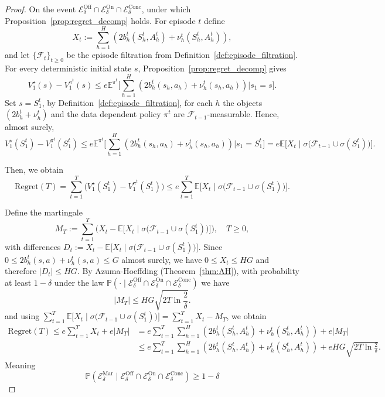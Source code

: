 \documentclass[twoside]{article}
\begin{document}
\begin{proof}
On the event \(\mathcal{E}^{\mathrm{Off}}_\delta\cap \mathcal{E}^{\mathrm{On}}_\delta \cap \mathcal{E}^{\mathrm{Conc}}_\delta \), under which Proposition~\ref{prop:regret_decomp} holds. For episode \(t\) define
\[
X_t:=\sum_{h=1}^H \left(2b_h^{t}(S_h^t,A_h^t)+ \nu_h^{t}(S_h^t,A_h^t)\right),
\]
and let \(\{\mathcal{F}_t\}_{t\ge 0}\) be the episode filtration from Definition~\ref{def:episode_filtration}. For every deterministic initial state \(s\), Proposition~\ref{prop:regret_decomp} gives
\[
V_1^\star(s)-V_1^{\pi^t}(s)\le e\mathbb{E}^{\pi^t}\Big[\sum_{h=1}^H \left(2b_h^{t}(s_h,a_h)+ \nu_h^{t}(s_h,a_h)\right)\Big|s_1=s\Big].
\]
Set \(s=S_1^t\), by Definition~\ref{def:episode_filtration}, for each \(h\) the objects \((2b_h^{t}+ \nu_h^{t})\) and the data dependent policy \(\pi^t\) are \(\mathcal{F}_{t-1}\)-measurable. Hence, almost surely,
\begin{equation}
\label{eq:step-given-G-formal}
V_1^\star(S_1^t)-V_1^{\pi^t}(S_1^t)
\le
e\mathbb{E}^{\pi^t}\Big[\sum_{h=1}^{H} \left(2b_h^{t}(s_h,a_h)+ \nu_h^{t}(s_h,a_h)\right)\Big|s_1=S_1^t\Big]
=
e\mathbb{E}\big[X_t\mid\sigma\big(\mathcal{F}_{t-1}\cup\sigma(S_1^t)\big)\big].
\end{equation}

Then, we obtain
\begin{equation}
\mathrm{Regret}(T)=\sum_{t=1}^T\big(V_1^\star(S_1^t)-V_1^{\pi^t}(S_1^t)\big)\le e\sum_{t=1}^T \mathbb{E}\big[X_t\mid \sigma\big(\mathcal{F}_{t-1}\cup\sigma(S_1^t)\big)\big].
\end{equation}

Define the martingale
\[
M_T:=\sum_{t=1}^T\Big(X_t-\mathbb{E}\big[X_t\mid \sigma\big(\mathcal{F}_{t-1}\cup\sigma(S_1^t)\big)\big]\Big),\quad T\ge 0,
\]
with differences \(D_t:=X_t-\mathbb{E}\big[X_t\mid \sigma\big(\mathcal{F}_{t-1}\cup\sigma(S_1^t)\big)\big]\). Since \(0\le 2b_h^{t}(s,a)+ \nu_h^{t}(s,a)\le G\) almost surely, we have \(0\le X_t\le HG\) and therefore \(|D_t|\le HG\). By Azuma-Hoeffding (Theorem~\ref{thm:AH}), with probability at least \(1-\delta\) under the law $\mathbb{P}\left (\cdot \mid \mathcal{E}^{\mathrm{Off}}_\delta\cap \mathcal{E}^{\mathrm{On}}_\delta \cap \mathcal{E}^{\mathrm{Conc}}_\delta\right )$ we have 
\[
|M_T|\le HG\sqrt{2T\ln\frac{2}{\delta}}.
\]
and using \(\sum_{t=1}^T \mathbb{E}\big[X_t\mid \sigma\big(\mathcal{F}_{t-1}\cup\sigma(S_1^t)\big)\big]=\sum_{t=1}^T X_t - M_T\), we obtain
\begin{align*}
\mathrm{Regret}(T)\le e\sum_{t=1}^T X_t + e|M_T|
& = e\sum_{t=1}^{T}\sum_{h=1}^{H} \left(2b_h^{t}(S_h^t,A_h^t)+ \nu_h^{t}(S_h^t,A_h^t)\right) + e|M_T| \\
& \leq e\sum_{t=1}^{T}\sum_{h=1}^{H} \left(2b_h^{t}(S_h^t,A_h^t)+ \nu_h^{t}(S_h^t,A_h^t)\right) + eHG\sqrt{2T\ln\frac{2}{\delta}}.
\end{align*}
Meaning 
\[\mathbb{P}\left (\mathcal{E}^{\mathrm{Mar}}_\delta \mid \mathcal{E}^{\mathrm{Off}}_\delta\cap \mathcal{E}^{\mathrm{On}}_\delta \cap \mathcal{E}^{\mathrm{Conc}}_\delta\right ) \geq 1-\delta\]


\end{proof}
\end{document}
